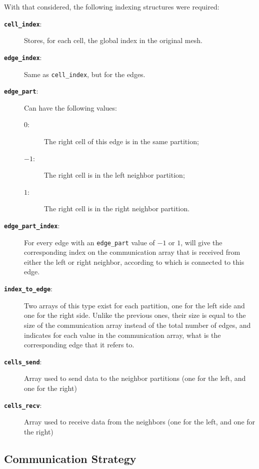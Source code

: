 With that considered, the following indexing structures were required:
\begin{description}

	\item[\textbf\texttt{cell\_index}:] Stores, for each cell, the global index in the original mesh.
	\item[\textbf\texttt{edge\_index}:] Same as \texttt{cell\_index}, but for the edges.

	\item[\textbf\texttt{edge\_part}:] Can have the following values:
		\begin{description}
			\item[$0$:]  The right cell of this edge is in the same partition;
			\item[$-1$:] The right cell is in the left neighbor partition;
			\item[$1$:]  The right cell is in the right neighbor partition.
		\end{description}

	\item[\textbf\texttt{edge\_part\_index}:] For every edge with an \texttt{edge\_part} value of $-1$ or $1$, will give the corresponding index on the communication array that is received from either the left or right neighbor, according to which is connected to this edge.

	\item[\textbf\texttt{index\_to\_edge}:] Two arrays of this type exist for each partition, one for the left side and one for the right side. Unlike the previous ones, their size is equal to the size of the communication array instead of the total number of edges, and indicates for each value in the communication array, what is the corresponding edge that it refers to.

	\item[\textbf\texttt{cells\_send}:] Array used to send data to the neighbor partitions (one for the left, and one for the right)
	\item[\textbf\texttt{cells\_recv}:] Array used to receive data from the neighbors (one for the left, and one for the right)

\end{description}

\subsection{Communication Strategy}
\label{subsec:heartbeat_comm}

